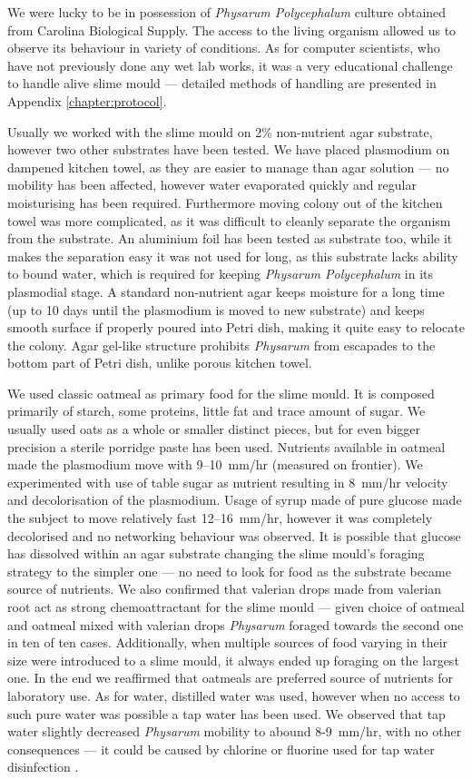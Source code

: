 We were lucky to be in possession of \textit{Physarum Polycephalum} culture obtained from Carolina Biological Supply. The access to the living organism allowed us to observe its behaviour in variety of conditions. As for computer scientists, who have not previously done any wet lab works, it was a very educational challenge to handle alive slime mould --- detailed methods of handling are presented in Appendix \ref{chapter:protocol}.

Usually we worked with the slime mould on 2\% non-nutrient agar substrate, however two other substrates have been tested. We have placed plasmodium on dampened kitchen towel, as they are easier to manage than agar solution --- no mobility has been affected, however water evaporated quickly and regular moisturising has been required. Furthermore moving colony out of the kitchen towel was more complicated, as it was difficult to cleanly separate the organism from the substrate. An aluminium foil has been tested as substrate too, while it makes the separation easy it was not used for long, as this substrate lacks ability to bound water, which is required for keeping \textit{Physarum Polycephalum} in its plasmodial stage. A standard non-nutrient agar keeps moisture for a long time (up to 10 days until the plasmodium is moved to new substrate) and keeps smooth surface if properly poured into Petri dish, making it quite easy to relocate the colony. Agar gel-like structure prohibits \textit{Physarum} from escapades to the bottom part of Petri dish, unlike porous kitchen towel. 

We used classic oatmeal as primary food for the slime mould. It is composed primarily of starch, some proteins, little fat and trace amount of sugar. We usually used oats as a whole or smaller distinct pieces, but for even bigger precision a sterile porridge paste has been used. Nutrients available in oatmeal made the plasmodium move with 9--10~mm/hr (measured on frontier). We experimented with use of table sugar as nutrient resulting in 8~mm/hr velocity and decolorisation of the plasmodium. Usage of syrup made of pure glucose made the subject to move relatively fast 12--16~mm/hr, however it was completely decolorised and no networking behaviour was observed. It is possible that glucose has dissolved within an agar substrate changing the slime mould's foraging strategy to the simpler one --- no need to look for food as the substrate became source of nutrients. We also confirmed that valerian drops made from valerian root act as strong chemoattractant for the slime mould \cite{adamatzky2012physarum} --- given choice of oatmeal and oatmeal mixed with valerian drops \textit{Physarum} foraged towards the second one in ten of ten cases. Additionally, when multiple sources of food varying in their size were introduced to a slime mould, it always ended up foraging on the largest one. In the end we reaffirmed that oatmeals are preferred source of nutrients for laboratory use. As for water, distilled water was used, however when no access to such pure water was possible a tap water has been used. We observed that tap water slightly decreased \textit{Physarum} mobility to abound 8-9~mm/hr, with no other consequences --- it could be caused by chlorine or fluorine used for tap water disinfection \cite{uden1983chlorinated}.

